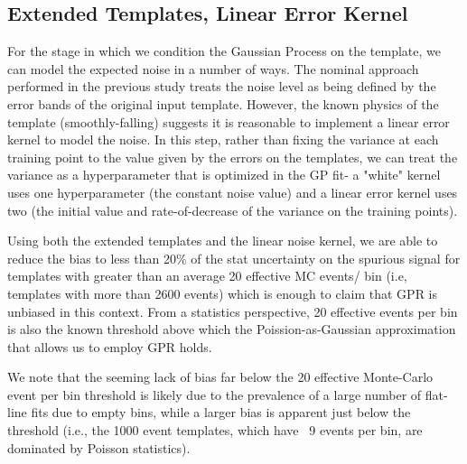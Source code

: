 \subsection{Extended Templates, Linear Error Kernel}

For the stage in which we condition the Gaussian Process on the template, we can model the expected noise in a number of ways. The nominal approach performed in the previous study treats the noise level as being defined by the error bands of the original input template. However, the known physics of the template (smoothly-falling) suggests it is reasonable to implement a linear error kernel to model the noise. In this step, rather than fixing the variance at each training point to the value given by the errors on the templates, we can treat the variance as a hyperparameter that is optimized in the GP fit- a "white" kernel uses one hyperparameter (the constant noise value) and a linear error kernel uses two (the initial value and rate-of-decrease of the variance on the training points).

Using both the extended templates and the linear noise kernel, we are able to reduce the bias to less than 20\% of the stat uncertainty on the spurious signal for templates with greater than an average 20 effective MC events/ bin (i.e, templates with more than 2600 events) which is enough to claim that GPR is unbiased in this context. From a statistics perspective, 20 effective events per bin is also the known threshold above which the Poission-as-Gaussian approximation that allows us to employ GPR holds.

We note that the seeming lack of bias far below the 20 effective Monte-Carlo event per bin threshold is likely due to the prevalence of a large number of flat-line fits due to empty bins, while a larger bias is apparent just below the threshold (i.e., the 1000 event templates, which have ~9 events per bin, are dominated by Poisson statistics).

